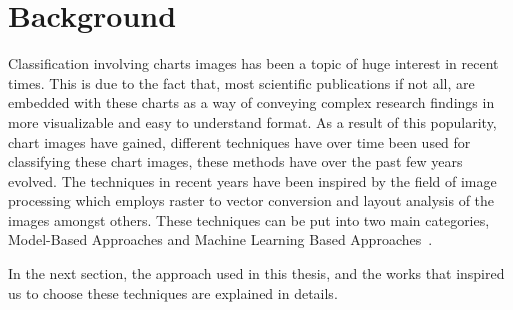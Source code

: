 \documentclass[12pt, a4paper,oneside]{report}
\begin{document}
\section{Background}
Classification involving charts images has been a topic of huge interest in recent times. This is due to the fact that, most scientific publications if not all, are embedded with these charts as a way of conveying complex research findings in more visualizable and easy to understand format. As a result of this popularity, chart images have gained, different techniques have over time been used for classifying these chart images, these methods have over the past few years evolved. The techniques in recent years have been inspired by the field of image processing which employs raster to vector conversion and layout analysis of the images amongst others. These techniques can be put into two main categories, Model-Based Approaches and Machine Learning Based Approaches~\cite{amara2017convolutional}. 

In the next section, the approach used in this thesis, and the works that inspired us to choose these techniques are explained in details.
\end{document}
